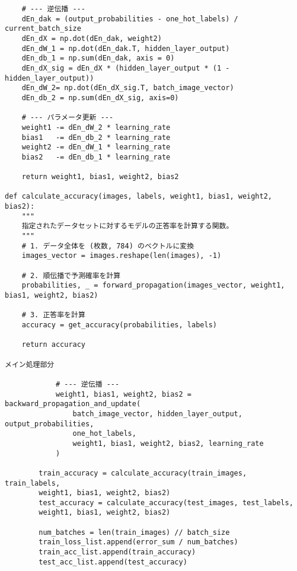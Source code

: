 \documentclass[11px,a4,dvipdfmx]{jsarticle}
\begin{document}
\begin{verbatim}
    # --- 逆伝播 ---
    dEn_dak = (output_probabilities - one_hot_labels) / current_batch_size
    dEn_dX = np.dot(dEn_dak, weight2)
    dEn_dW_1 = np.dot(dEn_dak.T, hidden_layer_output)
    dEn_db_1 = np.sum(dEn_dak, axis = 0)
    dEn_dX_sig = dEn_dX * (hidden_layer_output * (1 - hidden_layer_output))
    dEn_dW_2= np.dot(dEn_dX_sig.T, batch_image_vector)
    dEn_db_2 = np.sum(dEn_dX_sig, axis=0)

    # --- パラメータ更新 ---
    weight1 -= dEn_dW_2 * learning_rate 
    bias1   -= dEn_db_2 * learning_rate
    weight2 -= dEn_dW_1 * learning_rate 
    bias2   -= dEn_db_1 * learning_rate
    
    return weight1, bias1, weight2, bias2

def calculate_accuracy(images, labels, weight1, bias1, weight2, bias2):
    """
    指定されたデータセットに対するモデルの正答率を計算する関数。
    """
    # 1. データ全体を (枚数, 784) のベクトルに変換
    images_vector = images.reshape(len(images), -1)
    
    # 2. 順伝播で予測確率を計算
    probabilities, _ = forward_propagation(images_vector, weight1, bias1, weight2, bias2)
    
    # 3. 正答率を計算
    accuracy = get_accuracy(probabilities, labels)
    
    return accuracy

メイン処理部分
            
            # --- 逆伝播 ---
            weight1, bias1, weight2, bias2 = backward_propagation_and_update(
                batch_image_vector, hidden_layer_output, output_probabilities, 
                one_hot_labels,
                weight1, bias1, weight2, bias2, learning_rate
            )

        train_accuracy = calculate_accuracy(train_images, train_labels, 
        weight1, bias1, weight2, bias2)
        test_accuracy = calculate_accuracy(test_images, test_labels, 
        weight1, bias1, weight2, bias2)
        
        num_batches = len(train_images) // batch_size
        train_loss_list.append(error_sum / num_batches)
        train_acc_list.append(train_accuracy)
        test_acc_list.append(test_accuracy)
\end{verbatim}
\end{document}
